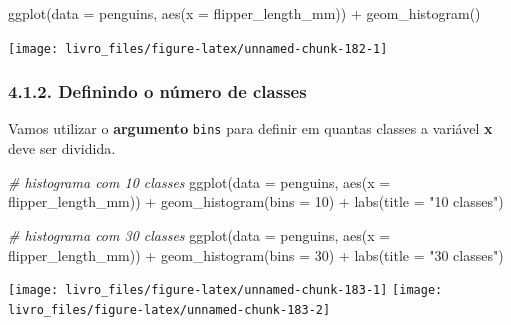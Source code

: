 \documentclass[
]{book}
\newenvironment{Shaded}{\begin{snugshade}}{\end{snugshade}}
\newcommand{\AttributeTok}[1]{\textcolor[rgb]{0.61,0.61,0.61}{#1}}
\newcommand{\CommentTok}[1]{\textcolor[rgb]{0.37,0.37,0.37}{\textit{#1}}}
\newcommand{\DecValTok}[1]{\textcolor[rgb]{0.06,0.06,0.06}{#1}}
\newcommand{\FunctionTok}[1]{\textcolor[rgb]{0,0,0}{#1}}
\newcommand{\NormalTok}[1]{#1}
\newcommand{\SpecialCharTok}[1]{\textcolor[rgb]{0,0,0}{#1}}
\newcommand{\StringTok}[1]{\textcolor[rgb]{0.5,0.5,0.5}{#1}}
\begin{document}
\begin{Shaded}
\begin{Highlighting}[]

\FunctionTok{ggplot}\NormalTok{(}\AttributeTok{data =}\NormalTok{ penguins, }
       \FunctionTok{aes}\NormalTok{(}\AttributeTok{x =}\NormalTok{ flipper\_length\_mm)) }\SpecialCharTok{+}
  \FunctionTok{geom\_histogram}\NormalTok{()}
\end{Highlighting}
\end{Shaded}

\begin{center}\texttt{[image: livro\_files/figure-latex/unnamed-chunk-182-1]} \end{center}

\hypertarget{definindo-o-nuxfamero-de-classes}{%
\subsubsection{4.1.2. Definindo o número de classes}\label{definindo-o-nuxfamero-de-classes}}

Vamos utilizar o \textbf{argumento} \texttt{bins} para definir em quantas classes a variável \textbf{x} deve ser dividida.

\begin{Shaded}
\begin{Highlighting}[]

\CommentTok{\# histograma com 10 classes}
\FunctionTok{ggplot}\NormalTok{(}\AttributeTok{data =}\NormalTok{ penguins, }
       \FunctionTok{aes}\NormalTok{(}\AttributeTok{x =}\NormalTok{ flipper\_length\_mm)) }\SpecialCharTok{+}
  \FunctionTok{geom\_histogram}\NormalTok{(}\AttributeTok{bins =} \DecValTok{10}\NormalTok{) }\SpecialCharTok{+}
  \FunctionTok{labs}\NormalTok{(}\AttributeTok{title =} \StringTok{"10 classes"}\NormalTok{)}

\CommentTok{\# histograma com 30 classes}
\FunctionTok{ggplot}\NormalTok{(}\AttributeTok{data =}\NormalTok{ penguins, }\FunctionTok{aes}\NormalTok{(}\AttributeTok{x =}\NormalTok{ flipper\_length\_mm)) }\SpecialCharTok{+}
  \FunctionTok{geom\_histogram}\NormalTok{(}\AttributeTok{bins =} \DecValTok{30}\NormalTok{) }\SpecialCharTok{+}
  \FunctionTok{labs}\NormalTok{(}\AttributeTok{title =} \StringTok{"30 classes"}\NormalTok{)}
\end{Highlighting}
\end{Shaded}

\begin{center}\texttt{[image: livro\_files/figure-latex/unnamed-chunk-183-1]} \texttt{[image: livro\_files/figure-latex/unnamed-chunk-183-2]} \end{center}
\end{document}
